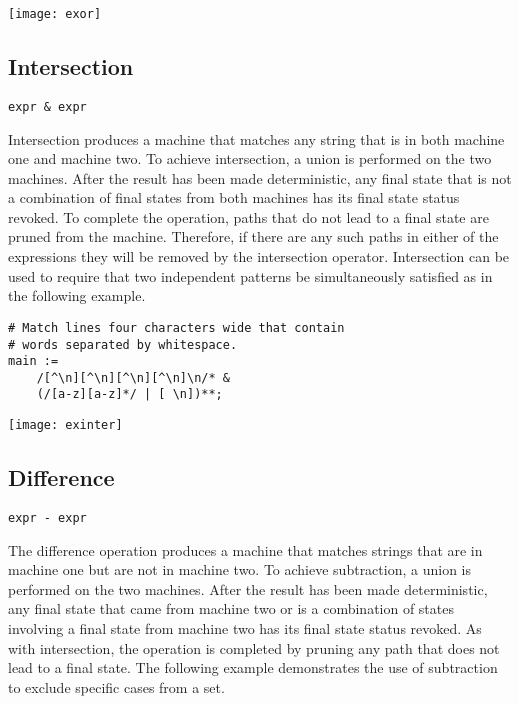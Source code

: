 \documentclass[letterpaper,11pt,oneside]{book}
\newcommand{\verbspace}{\vspace{10pt}}
\newcommand{\graphspace}{\vspace{10pt}}
\newenvironment{inline_code}{\def\baselinestretch{1}\vspace{12pt}\small}{}
\begin{document}
\graphspace
\begin{center}
\texttt{[image: exor]}
\end{center}

\subsection{Intersection}

\verb|expr & expr|
\verbspace

Intersection produces a machine that matches any
string that is in both machine one and machine two. To achieve intersection, a
union is performed on the two machines. After the result has been made
deterministic, any final state that is not a combination of final states from
both machines has its final state status revoked. To complete the operation,
paths that do not lead to a final state are pruned from the machine. Therefore,
if there are any such paths in either of the expressions they will be removed
by the intersection operator.  Intersection can be used to require that two
independent patterns be simultaneously satisfied as in the following example.

\begin{inline_code}
\begin{verbatim}
# Match lines four characters wide that contain 
# words separated by whitespace.
main :=
    /[^\n][^\n][^\n][^\n]\n/* &
    (/[a-z][a-z]*/ | [ \n])**;
\end{verbatim}
\end{inline_code}

\graphspace
\begin{center}
\texttt{[image: exinter]}
\end{center}

\subsection{Difference}

\verb|expr - expr|
\verbspace

The difference operation produces a machine that matches
strings that are in machine one but are not in machine two. To achieve subtraction,
a union is performed on the two machines. After the result has been made
deterministic, any final state that came from machine two or is a combination
of states involving a final state from machine two has its final state status
revoked. As with intersection, the operation is completed by pruning any path
that does not lead to a final state.  The following example demonstrates the
use of subtraction to exclude specific cases from a set.
\end{document}
